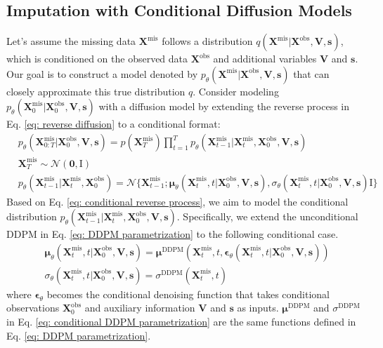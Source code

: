 \documentclass[11pt]{article}
\begin{document}
\subsection{Imputation with Conditional Diffusion Models}\label{sec: csdi}
Let's assume the missing data $\bm{X}^{\mathrm{mis}}$ follows a distribution $q(\bm{X}^{\mathrm{mis}}|\bm{X}^{\mathrm{obs}}, \bm{V}, \bm{s})$, which is conditioned on the observed data $\bm{X}^{\mathrm{obs}}$ and additional variables $\bm{V}$ and $\bm{s}$. Our goal is to construct a model denoted by $p_{\theta}(\bm{X}^{\mathrm{mis}}|\bm{X}^{\mathrm{obs}}, \bm{V}, \bm{s})$ that can closely approximate this true distribution $q$. Consider modeling $p_{\theta}(\bm{X}_0^{\mathrm{mis}}|\bm{X}_0^{\mathrm{obs}}, \bm{V}, \bm{s})$ with a diffusion model by extending the reverse process in Eq. \ref{eq: reverse diffusion} to a conditional format:
\begin{align}\label{eq: conditional reverse process}
	&p_{\theta}(\bm{X}_{0:T}^{\mathrm{mis}}|\bm{X}_0^{\mathrm{obs}}, \bm{V}, \bm{s})=p(\bm{X}_T^{\mathrm{mis}})\prod_{t=1}^T p_{\theta}(\bm{X}_{t-1}^{\mathrm{mis}}|\bm{X}_t^{\mathrm{mis}},\bm{X}_0^{\mathrm{obs}},\bm{V},\bm{s})\\
	&\bm{X}_T^{\mathrm{mis}}\sim \mathcal{N}(\bm{0},\bm{\mathrm{I}})\\
	&p_{\theta}(\bm{X}_{t-1}^{\mathrm{mis}}|\bm{X}_t^{\mathrm{mis}},\bm{X}_0^{\mathrm{obs}})=\mathcal{N}\{\bm{X}_{t-1}^{\mathrm{mis}};\bm{\mu}_{\theta}(\bm{X}_t^{\mathrm{mis}}, t|\bm{X}_0^{\mathrm{obs}},\bm{V},\bm{s}), \sigma_{\theta}(\bm{X}_t^{\mathrm{mis}},t|\bm{X}_0^{\mathrm{obs}},\bm{V},\bm{s})\bm{\mathrm{I}}\}
\end{align}
Based on Eq. \ref{eq: conditional reverse process}, we aim to model the conditional distribution $p_{\theta}(\bm{X}_{t-1}^{\mathrm{mis}}|\bm{X}_t^{\mathrm{mis}},\bm{X}_0^{\mathrm{obs}},\bm{V}, \bm{s})$. Specifically, we extend the unconditional DDPM in Eq. \ref{eq: DDPM parametrization} to the following conditional case. 
\begin{align}\label{eq: conditional DDPM parametrization}
	&\bm{\mu}_{\theta}(\bm{X}_t^{\mathrm{mis}}, t|\bm{X}_0^{\mathrm{obs}},\bm{V},\bm{s})=\bm{\mu}^{\mathrm{DDPM}}(\bm{X}_t^{\mathrm{mis}},t,\bm{\epsilon}_{\theta}(\bm{X}_t^{\mathrm{mis}},t|\bm{X}_0^{\mathrm{obs}},\bm{V},\bm{s}))\\
	&\sigma_{\theta}(\bm{X}_t^{\mathrm{mis}},t|\bm{X}_0^{\mathrm{obs}},\bm{V},\bm{s})=\sigma^{\mathrm{DDPM}}(\bm{X}_t^{\mathrm{mis}},t)
\end{align}
where $\bm{\epsilon}_{\theta}$ becomes the conditional denoising function that takes conditional observations $\bm{X}_0^{\mathrm{obs}}$ and auxiliary information $\bm{V}$ and $\bm{s}$ as inputs. $\bm{\mu}^{\mathrm{DDPM}}$ and $\sigma^{\mathrm{DDPM}}$ in Eq. \ref{eq: conditional DDPM parametrization} are the same functions defined in Eq. \ref{eq: DDPM parametrization}. 
 
\end{document}
